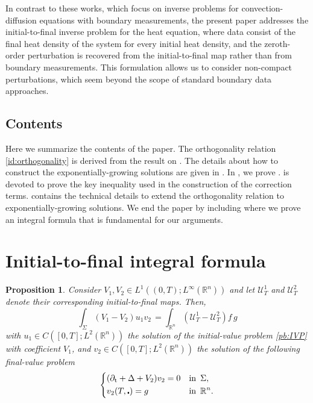 \documentclass[10pt,a4paper]{amsart}
\newtheorem{proposition}{Proposition}[section]
\theoremstyle{remark}
\theoremstyle{definition}
\newcommand{\R}{\mathbb{R}}
\newcommand{\tm}{\mathrm{t}}
\begin{document}
In contrast to these works, which focus on inverse problems for convection-diffusion equations with boundary measurements, the present paper addresses the initial-to-final inverse problem for the heat equation, where data consist of the final heat density of the system for every initial heat density, and the zeroth-order perturbation is recovered from the initial-to-final map rather than from boundary measurements. This formulation allows us to consider non-compact perturbations, which seem beyond the scope of standard boundary data approaches.


\subsection*{Contents} Here we summarize the contents of the paper. The orthogonality relation
\eqref{id:orthogonality} is derived from the result on . The details 
about how to construct the exponentially-growing solutions are given in .
In , we prove .  is
devoted to prove the key inequality used in the construction of the correction terms.
 contains the technical details to extend the orthogonality relation
to exponentially-growing solutions. We end the paper by including 
where we prove an integral formula that is fundamental for our arguments.


\section{Initial-to-final integral formula}\label{sec:int_formula}
\begin{proposition}\label{prop:integral_formula}\sl Consider 
$V_1, V_2 \in L^1((0,T); L^\infty(\R^n)) $ and let $ \mathcal{U}_T^1$ and 
$ \mathcal{U}_T^2$ denote their corresponding initial-to-final maps.
Then,
\[\int_\Sigma (V_1 - V_2) u_1 v_2 \, = \int_{\R^n} (\mathcal{U}_T^1 - \mathcal{U}_T^2)f \, g\]
with $u_1 \in C([0,T]; L^2(\R^n))$ the solution of the initial-value problem \eqref{pb:IVP}
with coefficient $V_1$, and $v_2 \in C([0,T]; L^2(\R^n))$ the solution of the following 
final-value problem
\begin{equation}
	\left\{
		\begin{aligned}
		& (\partial_\tm + \Delta + V_2) v_2 = 0 & & \textnormal{in} \enspace \Sigma, \\
		& v_2(T, \centerdot) = g &  & \textnormal{in} \enspace \R^n.
		\end{aligned}
	\right.
	\label{pb:FVP}
\end{equation}
\end{proposition}
\end{document}
